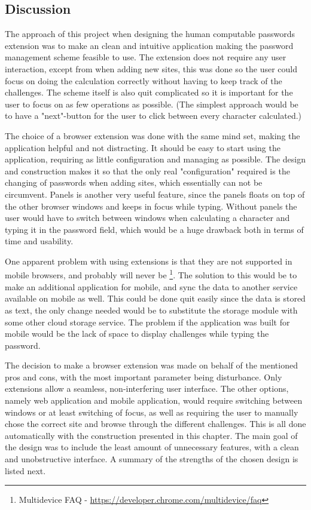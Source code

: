 \subsection{Discussion}
The approach of this project when designing the human computable passwords extension was to make an clean and intuitive application making the password management scheme feasible to use. The extension does not require any user interaction, except from when adding new sites, this was done so the user could focus on doing the calculation correctly without having to keep track of the challenges. The scheme itself is also quit complicated so it is important for the user to focus on as few operations as possible. (The simplest approach would be to have a "next"-button for the user to click between every character calculated.)
\par The choice of a browser extension was done with the same mind set, making the application helpful and not distracting. It should be easy to start using the application, requiring as little configuration and managing as possible. The design and construction makes it so that the only real "configuration" required is the changing of passwords when adding sites, which essentially can not be circumvent. Panels is another very useful feature, since the panels floats on top of the other browser windows and keeps in focus while typing. Without panels the user would have to switch between windows when calculating a character and typing it in the password field, which would be a huge drawback both in terms of time and usability. 
\par One apparent problem with using extensions is that they are not supported in mobile browsers, and probably will never be \footnote{Multidevice FAQ - \url{https://developer.chrome.com/multidevice/faq}}. The solution to this would be to make an additional application for mobile, and sync the data to another service available on mobile as well. This could be done quit easily since the data is stored as text, the only change needed would be to substitute the storage module with some other cloud storage service. The problem if the application was built for mobile would be the lack of space to display challenges while typing the password. 
\par The decision to make a browser extension was made on behalf of the mentioned pros and cons, with the most important parameter being disturbance. Only extensions allow a seamless, non-interfering user interface. The other options, namely web application and mobile application, would require switching between windows or at least switching of focus, as well as requiring the user to manually chose the correct site and browse through the different challenges. This is all done automatically with the construction presented in this chapter. The main goal of the design was to include the least amount of unnecessary features, with a clean and unobstructive interface. A summary of the strengths of the chosen design is listed next.

